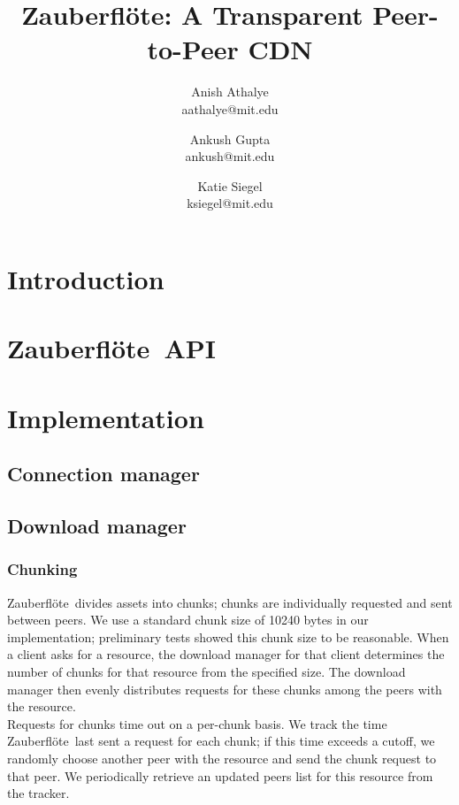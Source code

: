 \documentclass[letterpaper,twocolumn,10pt]{article}
\newcommand{\zbf}{Zauberfl\"{o}te}
\newcommand{\projtitle}{\zbf: A Transparent Peer-to-Peer CDN}
\begin{document}
\title{\Large \bf \projtitle}

\author{
    {\rm Anish Athalye}\\
    aathalye@mit.edu
    \and
    {\rm Ankush Gupta}\\
    ankush@mit.edu
    \and
    {\rm Katie Siegel}\\
    ksiegel@mit.edu
}

\maketitle
\thispagestyle{empty}

\begin{abstract}

\end{abstract}

\section{Introduction}


\section{\zbf\ API}


\section{Implementation}


\subsection{Connection manager}


\subsection{Download manager}


\subsubsection{Chunking}

\zbf\ divides assets into chunks; chunks are individually requested and sent between peers. We use a standard chunk size of 10240 bytes in our implementation; preliminary tests showed this chunk size to be reasonable. When a client asks for a resource, the download manager for that client determines the number of chunks for that resource from the specified size. The download manager then evenly distributes requests for these chunks among the peers with the resource. \\
Requests for chunks time out on a per-chunk basis. We track the time \zbf\ last sent a request for each chunk; if this time exceeds a cutoff, we randomly choose another peer with the resource and send the chunk request to that peer. We periodically retrieve an updated peers list for this resource from the tracker. 
\end{document}
